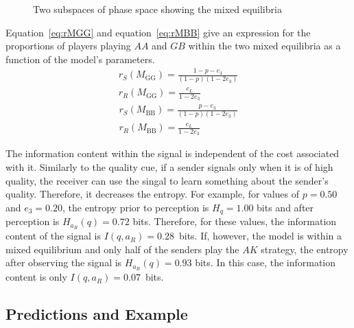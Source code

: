 \documentclass[a4paper,12pt]{article}
\numberwithin{equation}{section}
\begin{document}
\begin{figure}[h]
\begin{center}
\hspace{10mm}
\caption{Two subspaces of phase space showing the mixed equilibria}
\label{fig:Model 1/Figure 1213}
\end{center}
\end{figure}

Equation~\ref{eq:rMGG} and equation~\ref{eq:rMBB} give an expression for the proportions of players playing $AA$ and $GB$ within the two mixed equilibria as a function of the model's parameters.
\begin{subequations}
\label{eq:rMGG}
\begin{gather}
r_{S}(M_{\text{GG}})=\frac{1-p-e_{3}}{(1-p)(1-2 e_{3})}\\
r_{R}(M_{\text{GG}})=\frac{c_{L}}{1-2 e_{3}}
\end{gather}
\end{subequations}
\begin{subequations}
\label{eq:rMBB}
\begin{gather}
r_{S}(M_{\text{BB}})=\frac{p-e_{3}}{(1-p)(1-2 e_{3})}\\
r_{R}(M_{\text{BB}})=\frac{c_{L}}{1-2 e_{3}}
\end{gather}
\end{subequations}

The information content within the signal is independent of the cost associated with it. Similarly to the quality cue, if a sender signals only when it is of high quality, the receiver can use the singal to learn something about the sender's quality. Therefore, it decreases the entropy. For example, for values of $p = 0.50$ and $e_{3} = 0.20$, the entropy prior to perception is $H_{q} = 1.00$ bits and after perception is $H_{a_{R}}(q) = 0.72$ bits. Therefore, for these values, the information content of the signal is $I(q, a_{R}) = 0.28$~bits. If, however, the model is within a mixed equilibrium and only half of the senders play the $AK$ strategy, the entropy after observing the signal is $H_{a_{R}}(q) = 0.93$ bits. In this case, the information content is only $I(q, a_{R}) = 0.07$~bits.


\subsection{Predictions and Example}
\label{sec:Signalling Game/Example}
\end{document}
